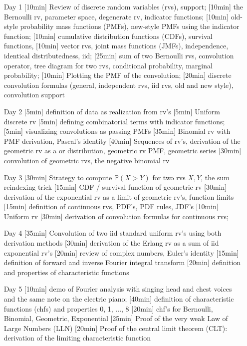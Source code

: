 \begin{enumerate}
\item[Day 1] [10min] Review of discrete random variables (rvs), support; [10min] the Bernoulli rv, parameter space, degenerate rv, indicator functions; [10min] old-style probability mass functions (PMFs), new-style PMFs using the indicator function; [10min] cumulative distribution functions (CDFs), survival functions, [10min] vector rvs, joint mass functions (JMFs), independence, identical distributedness, iid; [25min] sum of two Bernoulli rvs, convolution operator, tree diagram for two rvs, conditional probability, marginal probability; [10min] Plotting the PMF of the convolution; [20min] discrete convolution formulas (general, independent rvs, iid rvs, old and new style), convolution support

\item[Day 2] [5min] definition of data as realization from rv's [5min] Uniform discrete rv  [5min] defining combinatorial terms with indicator functions; [5min] visualizing convolutions as passing PMFs  [35min] Binomial rv with PMF derivation, Pascal's identity [40min] Sequences of rv's, derivation of the geometric rv as a  or  distribution, geometric rv PMF, geometric series [30min] convolution of geometric rvs, the negative binomial rv

\item[Day 3] [30min] Strategy to compute $\mathbb{P}(X > Y)$ for two rvs $X, Y$, the sum reindexing trick [15min] CDF / survival function of geometric rv [30min] derivation of the exponential rv as a limit of geometric rv's, function limits [15min] definition of continuous rvs, PDF's, PDF rules, JDF's [10min] Uniform rv [30min] derivation of convolution formulas for continuous rvs;

\item[Day 4] [35min] Convolution of two iid standard uniform rv's using both derivation methods [30min] derivation of the Erlang rv as a sum of iid exponential rv's [20min] review of complex numbers, Euler's identity  [15min] definition of forward and inverse Fourier integral transform [20min] definition and properties of characteristic functions  
 
\item[Day 5] [10min] demo of Fourier analysis with singing head and chest voices and the same note on the electric piano; [40min] definition of characteristic functions (chfs) and properties 0, 1, ..., 8 [20min] chf's for Bernoulli, Binomial, Geometric, Exponential [25min] Proof of the very weak Law of Large Numbers (LLN) [20min] Proof of the central limit theorem (CLT): derivation of the limiting characteristic function


\end{enumerate}

